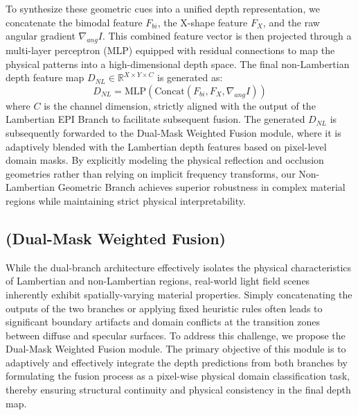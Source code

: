 To synthesize these geometric cues into a unified depth representation, we concatenate the bimodal feature $F_{bi}$, the X-shape feature $F_{X}$, and the raw angular gradient $\nabla_{ang} I$. This combined feature vector is then projected through a multi-layer perceptron (MLP) equipped with residual connections to map the physical patterns into a high-dimensional depth space. The final non-Lambertian depth feature map $D_{NL} \in \mathbb{R}^{X \times Y \times C}$ is generated as:
\begin{equation}
\label{eq:eq15}
D_{NL} = \text{MLP} \left( \text{Concat}(F_{bi}, F_{X}, \nabla_{ang} I) \right)
\end{equation}
where $C$ is the channel dimension, strictly aligned with the output of the Lambertian EPI Branch to facilitate subsequent fusion. The generated $D_{NL}$ is subsequently forwarded to the Dual-Mask Weighted Fusion module, where it is adaptively blended with the Lambertian depth features based on pixel-level domain masks. By explicitly modeling the physical reflection and occlusion geometries rather than relying on implicit frequency transforms, our Non-Lambertian Geometric Branch achieves superior robustness in complex material regions while maintaining strict physical interpretability.

\subsection{(Dual-Mask Weighted Fusion)}

While the dual-branch architecture effectively isolates the physical characteristics of Lambertian and non-Lambertian regions, real-world light field scenes inherently exhibit spatially-varying material properties. Simply concatenating the outputs of the two branches or applying fixed heuristic rules often leads to significant boundary artifacts and domain conflicts at the transition zones between diffuse and specular surfaces. To address this challenge, we propose the Dual-Mask Weighted Fusion module. The primary objective of this module is to adaptively and effectively integrate the depth predictions from both branches by formulating the fusion process as a pixel-wise physical domain classification task, thereby ensuring structural continuity and physical consistency in the final depth map.

